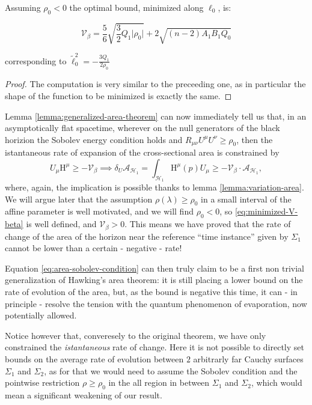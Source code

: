 \begin{prop}
	Assuming \(\rho_0 < 0\) the optimal bound, minimized along \(\ell_0\), is:

	\begin{equation}
		\label{eq:minimized-V-beta}
		\mathcal{V}_{\beta} = \frac{5}{6}\sqrt{\frac{3}{2}Q_1 \vert\rho_0\vert} + 2 \sqrt{(n - 2)A_1B_1Q_0}
	\end{equation}

	corresponding to \(\tilde{\ell}_0^2 = - \frac{3Q_1}{2\rho_0}\)
\end{prop}
\begin{proof}
	The computation is very similar to the preceeding one, as in particular the shape of the function to be minimized is exactly the same.
\end{proof}

Lemma \ref{lemma:generalized-area-theorem} can now immediately tell us that, in an asymptotically flat spacetime, wherever on the null generators of the black horizion the Sobolev energy condition holds and \(R_{\mu\nu}U^{\mu}U^{\nu} \ge \rho_0\), then the istantaneous rate of expansion of the cross-sectional area is constrained by
\begin{equation}
	\label{eq:area-sobolev-condition}
	U_{\mu}\mathrm{H}^{\mu} \ge - \mathcal{V}_{\beta} \implies \delta_U\mathcal{A}_{\mathscr{H}_1} = \int_{\mathscr{H}_1} \mathrm{H}^{\mu}(p)U_{\mu} \ge - \mathcal{V}_{\beta}\cdot\mathcal{A}_{\mathscr{H}_1},
\end{equation}
where, again, the implication is possible thanks to lemma \ref{lemma:variation-area}. We will argue later that the assumption \(\rho(\lambda) \ge \rho_0\) in a small interval of the affine parameter is well motivated, and we will find \(\rho_0 < 0\), so \eqref{eq:minimized-V-beta} is well defined, and \(\mathcal{V}_{\beta} >0\). This means we have proved that the rate of change of the area of the horizon near the reference ``time instance'' given by \(\Sigma_1\) cannot be lower than a certain - negative - rate!

Equation \eqref{eq:area-sobolev-condition} can then truly claim to be a first non trivial generalization of Hawking's area theorem: it is still placing a lower bound on the rate of evolution of the area, but, as the bound is negative this time, it can - in principle - resolve the tension with the quantum phenomenon of evaporation, now potentially allowed.
	
Notice however that, converesely to the original theorem, we have only constrained the \emph{istantaneous} rate of change. Here it is not possible to directly set bounds on the average rate of evolution between \(2\) arbitrarly far Cauchy surfaces \(\Sigma_1\) and \(\Sigma_2\), as for that we would need to assume the Sobolev condition and the pointwise restriction \(\rho \ge \rho_0\) in the all region in between \(\Sigma_1\) and \(\Sigma_2\), which would mean a significant weakening of our result.

